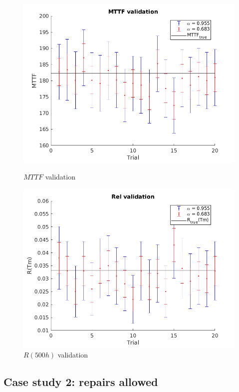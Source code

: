 \documentclass[a4paper,11pt]{article}
\begin{document}
\begin{figure}[h!]
    \centering
    \begin{minipage}{.5\textwidth}
        \centering
        \includegraphics[width=1\linewidth]{MTTF_val.png}
        \caption{$MTTF$ validation}
    \end{minipage}%
    \begin{minipage}{.5\textwidth}
        \centering
        \includegraphics[width=1\linewidth]{Rel_val.png}
        \caption{$R(500h)$ validation}
    \end{minipage}
\end{figure}

\subsection{Case study 2: repairs allowed}
\end{document}
